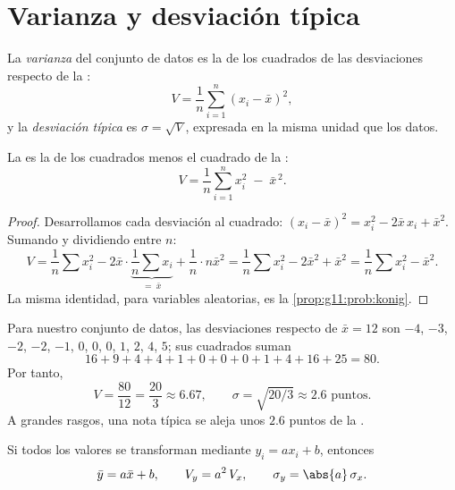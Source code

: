 \section{Varianza y desviación típica}

\begin{definition}\label{def:g11:stat:variance}
La \emph{varianza} del conjunto de datos es la  de
los cuadrados de las desviaciones respecto de la :
\[
V = \frac{1}{n}\sum_{i=1}^{n} (x_i - \bar x)^2,
\]
y la \emph{desviación típica} es
$\sigma = \sqrt{V}$, expresada en la misma unidad que los datos.
\end{definition}

\begin{proposition}\label{prop:g11:stat:shortcut}
La  es la  de los cuadrados menos el cuadrado de la :
\[
V = \frac{1}{n}\sum_{i=1}^{n} x_i^2 \;-\; \bar x^{\,2}.
\]
\end{proposition}

\begin{proof}
Desarrollamos cada desviación al cuadrado:
$(x_i - \bar x)^2 = x_i^2 - 2\bar x\, x_i + \bar x^2$. Sumando y
dividiendo entre $n$:
\[
V = \frac1n \sum x_i^2 - 2\bar x \cdot \underbrace{\frac1n \sum
x_i}_{=\ \bar x} + \frac1n \cdot n\bar x^2
= \frac1n\sum x_i^2 - 2\bar x^2 + \bar x^2
= \frac1n\sum x_i^2 - \bar x^2 .
\]
La misma identidad, para variables aleatorias, es la
\cref{prop:g11:prob:konig}.
\end{proof}

\begin{example}\label{ex:g11:stat:variance}
Para nuestro conjunto de datos, las desviaciones respecto de
$\bar x = 12$ son $-4$, $-3$, $-2$, $-2$, $-1$, $0$, $0$, $0$, $1$, $2$,
$4$, $5$; sus cuadrados suman
\[
16 + 9 + 4 + 4 + 1 + 0 + 0 + 0 + 1 + 4 + 16 + 25 = 80 .
\]
Por tanto,
\[
V = \frac{80}{12} = \frac{20}{3} \approx 6.67,
\qquad
\sigma = \sqrt{20/3} \approx 2.6 \text{ puntos}.
\]
A grandes rasgos, una nota típica se aleja unos $2.6$ puntos de la .
\end{example}

\begin{proposition}\label{prop:g11:stat:affine}
Si todos los valores se transforman mediante $y_i = a x_i + b$, entonces
\[
\bar y = a \bar x + b,
\qquad
V_y = a^2\, V_x,
\qquad
\sigma_y = \abs{a}\,\sigma_x .
\]
\end{proposition}


